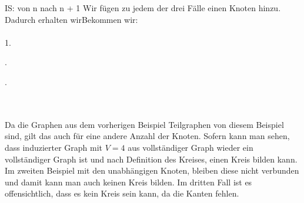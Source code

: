     IS: von n nach n + 1
    Wir fügen zu jedem der drei Fälle einen Knoten hinzu. Dadurch erhalten wirBekommen wir:\\\\
    1. 
    .
    .
    \\\\
    Da die Graphen aus dem vorherigen Beispiel Teilgraphen von diesem Beispiel sind, gilt das auch für eine andere Anzahl der Knoten. %
    Sofern kann man sehen, dass induzierter Graph mit $V=4$ aus vollständiger Graph wieder ein 
    vollständiger Graph ist und nach Definition des Kreises, einen Kreis bilden kann. Im zweiten Beispiel mit den unabhängigen Knoten, bleiben diese
    nicht verbunden und damit kann man auch keinen Kreis bilden. Im dritten Fall ist es offensichtlich, dass es kein Kreis sein kann, da die Kanten fehlen. 

